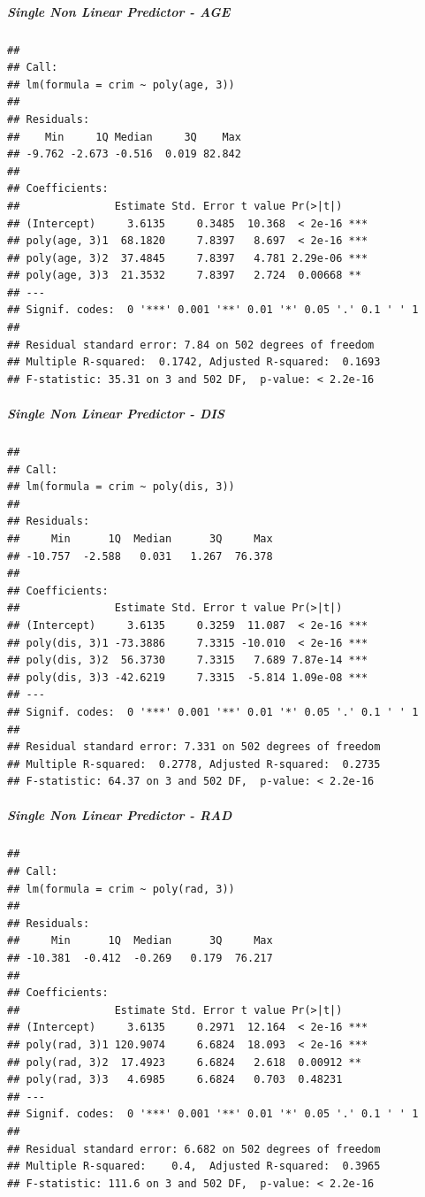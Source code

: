 \documentclass[
]{article}
\begin{document}
\hypertarget{single-non-linear-predictor---age}{%
\subparagraph{\texorpdfstring{\textbf{Single Non Linear Predictor -
AGE}}{Single Non Linear Predictor - AGE}}\label{single-non-linear-predictor---age}}

\begin{verbatim}
## 
## Call:
## lm(formula = crim ~ poly(age, 3))
## 
## Residuals:
##    Min     1Q Median     3Q    Max 
## -9.762 -2.673 -0.516  0.019 82.842 
## 
## Coefficients:
##               Estimate Std. Error t value Pr(>|t|)    
## (Intercept)     3.6135     0.3485  10.368  < 2e-16 ***
## poly(age, 3)1  68.1820     7.8397   8.697  < 2e-16 ***
## poly(age, 3)2  37.4845     7.8397   4.781 2.29e-06 ***
## poly(age, 3)3  21.3532     7.8397   2.724  0.00668 ** 
## ---
## Signif. codes:  0 '***' 0.001 '**' 0.01 '*' 0.05 '.' 0.1 ' ' 1
## 
## Residual standard error: 7.84 on 502 degrees of freedom
## Multiple R-squared:  0.1742, Adjusted R-squared:  0.1693 
## F-statistic: 35.31 on 3 and 502 DF,  p-value: < 2.2e-16
\end{verbatim}

\hypertarget{single-non-linear-predictor---dis}{%
\subparagraph{\texorpdfstring{\textbf{Single Non Linear Predictor -
DIS}}{Single Non Linear Predictor - DIS}}\label{single-non-linear-predictor---dis}}

\begin{verbatim}
## 
## Call:
## lm(formula = crim ~ poly(dis, 3))
## 
## Residuals:
##     Min      1Q  Median      3Q     Max 
## -10.757  -2.588   0.031   1.267  76.378 
## 
## Coefficients:
##               Estimate Std. Error t value Pr(>|t|)    
## (Intercept)     3.6135     0.3259  11.087  < 2e-16 ***
## poly(dis, 3)1 -73.3886     7.3315 -10.010  < 2e-16 ***
## poly(dis, 3)2  56.3730     7.3315   7.689 7.87e-14 ***
## poly(dis, 3)3 -42.6219     7.3315  -5.814 1.09e-08 ***
## ---
## Signif. codes:  0 '***' 0.001 '**' 0.01 '*' 0.05 '.' 0.1 ' ' 1
## 
## Residual standard error: 7.331 on 502 degrees of freedom
## Multiple R-squared:  0.2778, Adjusted R-squared:  0.2735 
## F-statistic: 64.37 on 3 and 502 DF,  p-value: < 2.2e-16
\end{verbatim}

\hypertarget{single-non-linear-predictor---rad}{%
\subparagraph{\texorpdfstring{\textbf{Single Non Linear Predictor -
RAD}}{Single Non Linear Predictor - RAD}}\label{single-non-linear-predictor---rad}}

\begin{verbatim}
## 
## Call:
## lm(formula = crim ~ poly(rad, 3))
## 
## Residuals:
##     Min      1Q  Median      3Q     Max 
## -10.381  -0.412  -0.269   0.179  76.217 
## 
## Coefficients:
##               Estimate Std. Error t value Pr(>|t|)    
## (Intercept)     3.6135     0.2971  12.164  < 2e-16 ***
## poly(rad, 3)1 120.9074     6.6824  18.093  < 2e-16 ***
## poly(rad, 3)2  17.4923     6.6824   2.618  0.00912 ** 
## poly(rad, 3)3   4.6985     6.6824   0.703  0.48231    
## ---
## Signif. codes:  0 '***' 0.001 '**' 0.01 '*' 0.05 '.' 0.1 ' ' 1
## 
## Residual standard error: 6.682 on 502 degrees of freedom
## Multiple R-squared:    0.4,  Adjusted R-squared:  0.3965 
## F-statistic: 111.6 on 3 and 502 DF,  p-value: < 2.2e-16
\end{verbatim}
\end{document}
